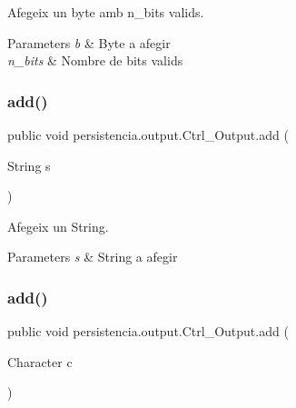 Afegeix un byte amb n\+\_\+bits valids. 


\begin{DoxyParams}{Parameters}
{\em b} & Byte a afegir \\
\hline
{\em n\+\_\+bits} & Nombre de bits valids \\
\hline
\end{DoxyParams}
\mbox{\label{classpersistencia_1_1output_1_1Ctrl__Output_a0e3bedb0b88d0e60b228cc49143e6f0e}} 
\subsubsection{\texorpdfstring{add()}{add()}\hspace{0.1cm}{\footnotesize\ttfamily [2/6]}}
{\footnotesize\ttfamily public void persistencia.\+output.\+Ctrl\+\_\+\+Output.\+add (\begin{DoxyParamCaption}\item[{String}]{s }\end{DoxyParamCaption})\hspace{0.3cm}{\ttfamily [inline]}}



Afegeix un String. 


\begin{DoxyParams}{Parameters}
{\em s} & String a afegir \\
\hline
\end{DoxyParams}
\mbox{\label{classpersistencia_1_1output_1_1Ctrl__Output_a4070b40016edf1d959b3f7c60c90ef10}} 
\subsubsection{\texorpdfstring{add()}{add()}\hspace{0.1cm}{\footnotesize\ttfamily [3/6]}}
{\footnotesize\ttfamily public void persistencia.\+output.\+Ctrl\+\_\+\+Output.\+add (\begin{DoxyParamCaption}\item[{Character}]{c }\end{DoxyParamCaption})\hspace{0.3cm}{\ttfamily [inline]}}



